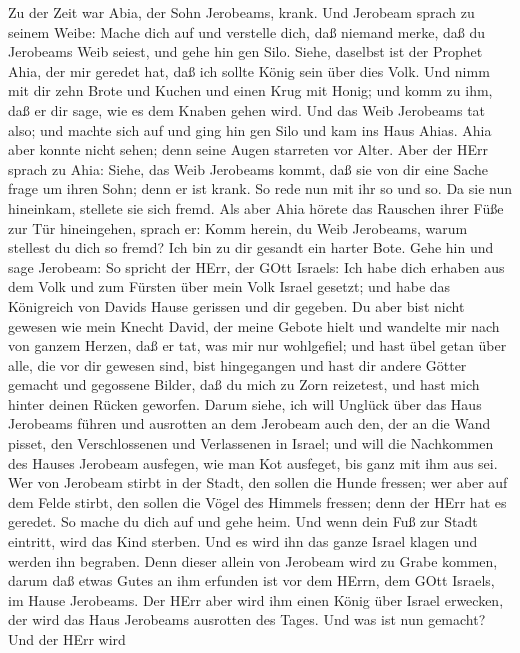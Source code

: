  Zu der Zeit war Abia, der Sohn Jerobeams, krank.
 Und Jerobeam sprach zu seinem Weibe: Mache dich auf und
verstelle dich, daß niemand merke, daß du Jerobeams Weib seiest, und
gehe hin gen Silo. Siehe, daselbst ist der Prophet Ahia, der mir geredet
hat, daß ich sollte König sein über dies Volk.  Und nimm mit
dir zehn Brote und Kuchen und einen Krug mit Honig; und komm zu ihm, daß
er dir sage, wie es dem Knaben gehen wird.  Und das Weib
Jerobeams tat also; und machte sich auf und ging hin gen Silo und kam
ins Haus Ahias. Ahia aber konnte nicht sehen; denn seine Augen starreten
vor Alter.  Aber der HErr sprach zu Ahia: Siehe, das Weib
Jerobeams kommt, daß sie von dir eine Sache frage um ihren Sohn; denn er
ist krank. So rede nun mit ihr so und so. Da sie nun hineinkam, stellete
sie sich fremd.  Als aber Ahia hörete das Rauschen ihrer
Füße zur Tür hineingehen, sprach er: Komm herein, du Weib Jerobeams,
warum stellest du dich so fremd? Ich bin zu dir gesandt ein harter Bote.
 Gehe hin und sage Jerobeam: So spricht der HErr, der GOtt
Israels: Ich habe dich erhaben aus dem Volk und zum Fürsten über mein
Volk Israel gesetzt;  und habe das Königreich von Davids
Hause gerissen und dir gegeben. Du aber bist nicht gewesen wie mein
Knecht David, der meine Gebote hielt und wandelte mir nach von ganzem
Herzen, daß er tat, was mir nur wohlgefiel;  und hast übel
getan über alle, die vor dir gewesen sind, bist hingegangen und hast dir
andere Götter gemacht und gegossene Bilder, daß du mich zu Zorn
reizetest, und hast mich hinter deinen Rücken geworfen. 
Darum siehe, ich will Unglück über das Haus Jerobeams führen und
ausrotten an dem Jerobeam auch den, der an die Wand pisset, den
Verschlossenen und Verlassenen in Israel; und will die Nachkommen des
Hauses Jerobeam ausfegen, wie man Kot ausfeget, bis ganz mit ihm aus
sei.  Wer von Jerobeam stirbt in der Stadt, den sollen die
Hunde fressen; wer aber auf dem Felde stirbt, den sollen die Vögel des
Himmels fressen; denn der HErr hat es geredet.  So mache du
dich auf und gehe heim. Und wenn dein Fuß zur Stadt eintritt, wird das
Kind sterben.  Und es wird ihn das ganze Israel klagen und
werden ihn begraben. Denn dieser allein von Jerobeam wird zu Grabe
kommen, darum daß etwas Gutes an ihm erfunden ist vor dem HErrn, dem
GOtt Israels, im Hause Jerobeams.  Der HErr aber wird ihm
einen König über Israel erwecken, der wird das Haus Jerobeams ausrotten
des Tages. Und was ist nun gemacht?  Und der HErr wird
